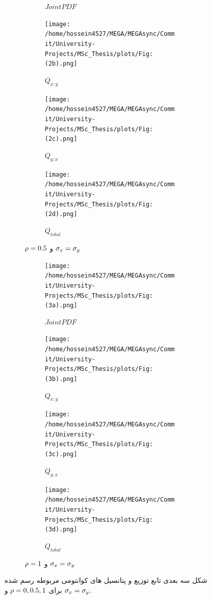 \documentclass[a4paper,titlepage,12pt,fleqn,oneside]{report}
\begin{document}
\begin{figure}[tbp]
\begin{subfigure}[b]{\textwidth}
\begin{subfigure}[b]{0.24\textwidth}
				\caption{$Joint PDF$}
				\label{fig:1.2.1}
			\end{subfigure}
			\hfill
			\begin{subfigure}[b]{0.24\textwidth}
				\renewcommand\thesubfigure{ii}
				\centering
				\texttt{[image: /home/hossein4527/MEGA/MEGAsync/Commit/University-Projects/MSc\_Thesis/plots/Fig:(2b).png]}
				\caption{$Q_{x:y}$}
				\label{fig:1.2.2}
			\end{subfigure}
			\hfill
			\begin{subfigure}[b]{0.24\textwidth}
				\renewcommand\thesubfigure{iii}
				\centering
				\texttt{[image: /home/hossein4527/MEGA/MEGAsync/Commit/University-Projects/MSc\_Thesis/plots/Fig:(2c).png]}
				\caption{$Q_{y:x}$}
				\label{fig:1.2.3}
			\end{subfigure}
			\hfill
			\begin{subfigure}[b]{0.24\textwidth}
				\renewcommand\thesubfigure{iv}
				\centering
				\texttt{[image: /home/hossein4527/MEGA/MEGAsync/Commit/University-Projects/MSc\_Thesis/plots/Fig:(2d).png]}
				\caption{$Q_{total}$}
				\label{fig:1.2.4}
			\end{subfigure}
			\caption{$\protect\rho =0.5$ و $\protect\sigma _{x}=\protect\sigma _{y}$}
			\label{fig:1.2}	
		\end{subfigure}
		\begin{subfigure}[b]{\textwidth}
			\renewcommand\thesubfigure{c}
			\begin{subfigure}[b]{0.24\textwidth}
				\renewcommand\thesubfigure{i}
				\centering
				\texttt{[image: /home/hossein4527/MEGA/MEGAsync/Commit/University-Projects/MSc\_Thesis/plots/Fig:(3a).png]}
				\caption{$Joint PDF$}
				\label{fig:1.3.1}
			\end{subfigure}
			\hfill
			\begin{subfigure}[b]{0.24\textwidth}
				\renewcommand\thesubfigure{ii}
				\centering
				\texttt{[image: /home/hossein4527/MEGA/MEGAsync/Commit/University-Projects/MSc\_Thesis/plots/Fig:(3b).png]}
				\caption{$Q_{x:y}$}
				\label{fig:1.3.2}
			\end{subfigure}
			\hfill
			\begin{subfigure}[b]{0.24\textwidth}
				\renewcommand\thesubfigure{iii}
				\centering
				\texttt{[image: /home/hossein4527/MEGA/MEGAsync/Commit/University-Projects/MSc\_Thesis/plots/Fig:(3c).png]}
				\caption{$Q_{y:x}$}
				\label{fig:1.3.3}
			\end{subfigure}
			\hfill
			\begin{subfigure}[b]{0.24\textwidth}
				\renewcommand\thesubfigure{iv}
				\centering
				\texttt{[image: /home/hossein4527/MEGA/MEGAsync/Commit/University-Projects/MSc\_Thesis/plots/Fig:(3d).png]}
				\caption{$Q_{total}$}
				\label{fig:1.3.4}
			\end{subfigure}
			\caption{$\protect\rho =1$ و $\protect\sigma _{x}=\protect\sigma _{y}$}
			\label{fig:1.3}
		\end{subfigure}	
		\caption{  		شکل سه بعدی تابع توزیع و پتانسیل های کوانتومی مربوطه رسم شده برای 
			$\protect\rho =0, 0.5, 1$ و  $\protect\sigma _{x}=%
			\protect\sigma _{y}$.}
		\label{fig:1t}
	\end{figure}
	
\end{document}
